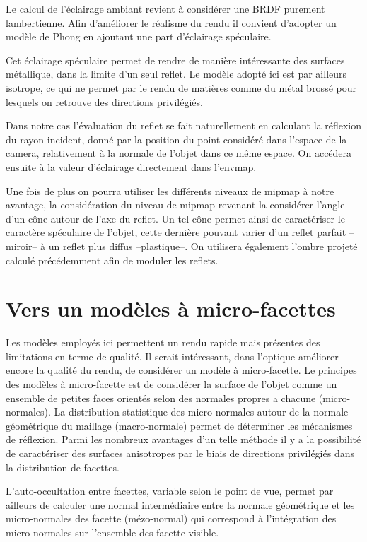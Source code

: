 \documentclass[10pt,a4paper,twoside, twocolumn]{report}
\begin{document}
Le calcul de l'éclairage ambiant revient à considérer une BRDF purement lambertienne. Afin d'améliorer le réalisme du rendu il convient d'adopter un modèle de Phong en ajoutant une part d'éclairage spéculaire.

Cet éclairage spéculaire permet de rendre de manière intéressante des surfaces métallique, dans la limite d'un seul reflet. Le modèle adopté ici est par ailleurs isotrope, ce qui ne permet par le rendu de matières comme du métal brossé pour lesquels on retrouve des directions privilégiés.

Dans notre cas l'évaluation du reflet se fait naturellement en calculant la réflexion du rayon incident, donné par la position du point considéré dans l'espace de la camera, relativement à la normale de l'objet dans ce même espace. On accédera ensuite à la valeur d'éclairage directement dans l'envmap.

Une fois de plus on pourra utiliser les différents niveaux de mipmap à notre avantage, la considération du niveau de mipmap revenant la considérer l'angle d'un cône autour de l'axe du reflet. Un tel cône permet ainsi de caractériser le caractère spéculaire de l'objet, cette dernière pouvant varier d'un reflet parfait --miroir-- à un reflet plus diffus --plastique--.
On utilisera également l'ombre projeté calculé précédemment afin de moduler les reflets.


\section{Vers un modèles à micro-facettes}

Les modèles employés ici permettent un rendu rapide mais présentes des limitations en terme de qualité. Il serait intéressant, dans l'optique améliorer encore la qualité du rendu, de considérer un modèle à micro-facette. 
Le principes des modèles à micro-facette est de considérer la surface de l'objet comme un ensemble de petites faces orientés selon des normales propres a chacune (micro-normales). La distribution statistique des micro-normales autour de la normale géométrique du maillage (macro-normale) permet de déterminer les mécanismes de réflexion. Parmi les nombreux avantages d'un telle méthode il y a la possibilité de caractériser des surfaces anisotropes par le biais de directions privilégiés dans la distribution de facettes.

L'auto-occultation entre facettes, variable selon le point de vue, permet par ailleurs de calculer une normal intermédiaire entre la normale géométrique et les micro-normales des facette (mézo-normal) qui correspond à l’intégration des micro-normales sur l'ensemble des facette visible\cite{Bruneton2010}\cite{Dupuy2012}\cite{Heitz2013}.
\end{document}
